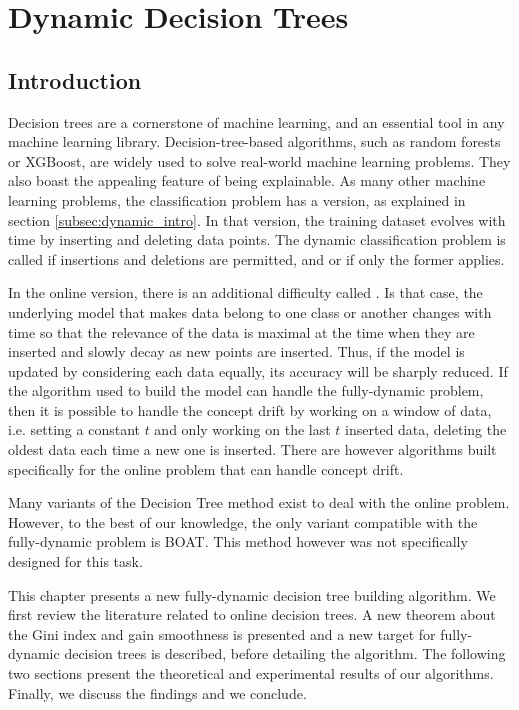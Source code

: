 \chapter{Dynamic Decision Trees}
\section{Introduction}
Decision trees are a cornerstone of machine learning, and an essential tool in any machine learning library. Decision-tree-based algorithms, such as random forests or XGBoost, are widely used to solve real-world machine learning problems. They also boast the appealing feature of being explainable.
As many other machine learning problems, the classification problem has a  version, as explained in section \ref{subsec:dynamic_intro}. In that version, the training dataset evolves with time by inserting and deleting data points. The dynamic classification problem is called  if insertions and deletions are permitted, and  or  if only the former applies.

In the online version, there is an additional difficulty called . Is that case, the underlying model that makes data belong to one class or another changes with time so that the relevance of the data is maximal at the time when they are inserted and slowly decay as new points are inserted. Thus, if the model is updated by considering each data equally, its accuracy will be sharply reduced. If the algorithm used to build the model can handle the fully-dynamic problem, then it is possible to handle the concept drift by working on a window of data, i.e. setting a constant $t$ and only working on the last $t$ inserted data, deleting the oldest data each time a new one is inserted. There are however algorithms built specifically for the online problem that can handle concept drift.

Many variants of the Decision Tree method exist to deal with the online problem. However, to the best of our knowledge, the only variant compatible with the fully-dynamic problem is BOAT. This method however was not specifically designed for this task.

This chapter presents a new fully-dynamic decision tree building algorithm. We first review the literature related to online decision trees. A new theorem about the Gini index and gain smoothness is presented and a new target for fully-dynamic decision trees is described, before detailing the algorithm. The following two sections present the theoretical and experimental results of our algorithms. Finally, we discuss the findings and we conclude.


